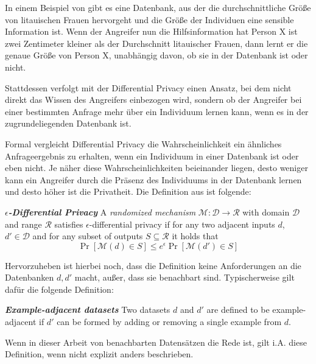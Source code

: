In einem Beispiel von \citeauthor{dwork:2006} gibt es eine Datenbank, aus der die durchschnittliche Größe von litauischen Frauen hervorgeht und die Größe der Individuen eine sensible Information ist. Wenn der Angreifer nun die Hilfsinformation hat \glqq{}Person X ist zwei Zentimeter kleiner als der Durchschnitt litauischer Frauen\grqq{}, dann lernt er die genaue Größe von Person X, unabhängig davon, ob sie in der Datenbank ist oder nicht. 

Stattdessen verfolgt \citeauthor{dwork:2006} mit der Differential Privacy einen Ansatz, bei dem nicht direkt das Wissen des Angreifers einbezogen wird, sondern ob der Angreifer bei einer bestimmten Anfrage mehr über ein Individuum lernen kann, wenn es in der zugrundeliegenden Datenbank ist.

Formal vergleicht Differential Privacy die Wahrscheinlichkeit ein ähnliches Anfrageergebnis zu erhalten, wenn ein Individuum in einer Datenbank ist oder eben nicht. Je näher diese Wahrscheinlichkeiten beieinander liegen, desto weniger kann ein Angreifer durch die Präsenz des Individuums in der Datenbank lernen und desto höher ist die Privatheit. Die Definition aus \cite{dwork:2006} ist folgende:

\begin{definition}\label{def:eps-differential-privacy}
	\emph{\textbf{$\epsilon$-Differential Privacy}} A \textit{randomized mechanism} $\mathcal{M}: \mathcal{D} \rightarrow \mathcal{R}$ with domain $\mathcal{D}$ and range $\mathcal{R}$ satisfies $\epsilon$-differential privacy if for any two adjacent inputs $d$, $d' \in \mathcal{D}$ and for any subset of outputs $S \subseteq \mathcal{R}$ it holds that $$\Pr[\mathcal{M}(d) \in S] \leq e^{\epsilon} \Pr[\mathcal{M}(d') \in S]$$
\end{definition}

Hervorzuheben ist hierbei noch, dass die Definition keine Anforderungen an die Datenbanken $d, d'$ macht, außer, dass sie benachbart sind. Typischerweise gilt dafür die folgende Definition:
\begin{definition}\label{def:example-adjacency}
	\emph{\textbf{Example-adjacent datasets}} Two datasets $d$ and $d'$ are defined to be example-adjacent if $d'$ can be formed by adding or removing a single example from $d$.
\end{definition}

Wenn in dieser Arbeit von benachbarten Datensätzen die Rede ist, gilt i.A. diese Definition, wenn nicht explizit anders beschrieben.

